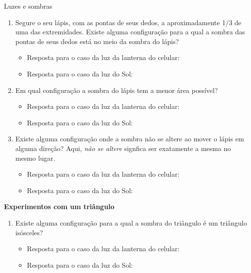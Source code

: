 \begin{task}{Luzes e sombras}
\begin{enumerate}
\begin{itemize}
\end{itemize}

\item {} 
Segure o seu lápis, com as pontas de seus dedos, a aproximadamente 1/3 de uma das extremidades. Existe alguma configuração para a qual a sombra das pontas de seus dedos está no meio da sombra do lápis?
\begin{itemize}
\item {} 
Resposta para o caso da luz da lanterna do celular:

\item {} 
Resposta para o caso da luz do Sol:

\end{itemize}

\item {} 
Em qual configuração a sombra do lápis tem a menor área possível?
\begin{itemize}
\item {} 
Resposta para o caso da luz da lanterna do celular:

\item {} 
Resposta para o caso da luz do Sol:

\end{itemize}

\item {} 
Existe alguma configuração onde a sombra não se altere ao mover o lápis em alguma direção? Aqui, \emph{não se altere} signfica ser exatamente a mesma no mesmo lugar.
\begin{itemize}
\item {} 
Resposta para o caso da luz da lanterna do celular:

\item {} 
Resposta para o caso da luz do Sol:

\end{itemize}

\end{enumerate}

\textbf{Experimentos com um triângulo}
\begin{enumerate}
\item {} 
Existe alguma configuração para a qual a sombra do triângulo é um triângulo isósceles?
\begin{itemize}
\item {} 
Resposta para o caso da luz da lanterna do celular:

\item {} 
Resposta para o caso da luz do Sol:

\end{itemize}


\end{enumerate}
\end{task}
